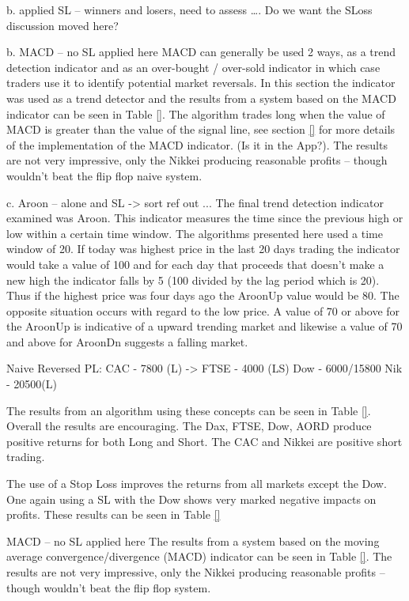 b. applied SL – winners and losers, need to assess ….  Do we want the SLoss discussion moved here?

b. MACD – no SL applied here
MACD can generally be used 2 ways, as a trend detection indicator and as an over-bought / over-sold indicator in which case traders use it to identify potential market reversals. In this section the indicator was used as a trend detector and the results from a system based on the MACD indicator can be seen in Table \ref{}.  The algorithm trades long when the value of MACD is greater than the value of the signal line, see section \ref{} for more details of the implementation of the MACD indicator. (Is it in the App?). The results are not very impressive, only the Nikkei producing reasonable profits – though wouldn't beat the flip flop naive system.

c. Aroon – alone and SL -> sort ref out ...
The final trend detection indicator examined was Aroon.  This indicator measures the time since the previous high or low within a certain time window. The algorithms presented here used a time window of 20. If today was highest price in the last 20 days trading the indicator would take a value of 100 and for each day that proceeds that doesn't make a new high the indicator falls by 5 (100 divided by the lag period which is 20).  Thus if the highest price was four days ago the AroonUp value would be 80. The opposite situation occurs with regard to the low price. A value of 70 or above for the AroonUp is indicative of a upward trending market and likewise a value of 70 and above for AroonDn suggests a falling market.

Naive Reversed PL:
CAC - 7800 (L)  -> 
FTSE - 4000 (LS)
Dow - 6000/15800
Nik - 20500(L)

The results from an algorithm using these concepts can be seen in Table \ref{}. Overall the results are encouraging.  The Dax, FTSE, Dow, AORD produce positive returns for both Long and Short. The CAC and Nikkei are positive short trading. 

The use of a Stop Loss improves the returns from all markets except the Dow. One again using a SL with the Dow shows very marked negative impacts on profits. These results can be seen in Table \ref{}

MACD – no SL applied here
The results from a system based on the moving average convergence/divergence (MACD) indicator can be seen in Table \ref{}. The results are not very impressive, only the Nikkei producing reasonable profits – though wouldn't beat the flip flop system.


